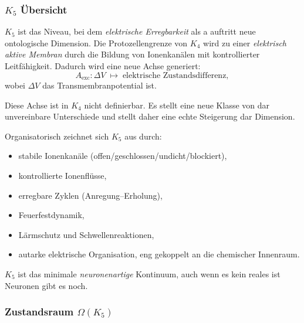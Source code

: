 

\subsubsection{\texorpdfstring{$K_5$}{K_5} Übersicht}
\label{sec:k5-overview}

$K_5$ ist das Niveau, bei dem \emph{elektrische Erregbarkeit} als a auftritt
neue ontologische Dimension. Die Protozellengrenze von $K_4$ wird zu einer
\emph{elektrisch aktive Membran} durch die Bildung von Ionenkanälen
mit kontrollierter Leitfähigkeit. Dadurch wird eine neue Achse generiert:
\[
A_{\mathrm{exc}}: \Delta V \;\mapsto\; \text{elektrische Zustandsdifferenz},
\]
wobei $\Delta V$ das Transmembranpotential ist.

Diese Achse ist in $K_4$ nicht definierbar. Es stellt eine neue Klasse von dar
unvereinbare Unterschiede und stellt daher eine echte Steigerung dar
Dimension.

Organisatorisch zeichnet sich $K_5$ aus durch:
\begin{itemize}
    \item stabile Ionenkanäle (offen/geschlossen/undicht/blockiert),
    \item kontrollierte Ionenflüsse,
    \item erregbare Zyklen (Anregung–Erholung),
    \item Feuerfestdynamik,
    \item Lärmschutz und Schwellenreaktionen,
    \item autarke elektrische Organisation, eng gekoppelt an die
          chemischer Innenraum.
\end{itemize}

$K_5$ ist das minimale \emph{neuronenartige} Kontinuum, auch wenn es kein reales ist
Neuronen gibt es noch.

\subsubsection{Zustandsraum \texorpdfstring{$\Omega(K_5)$}{\Omega(K_5)}}

